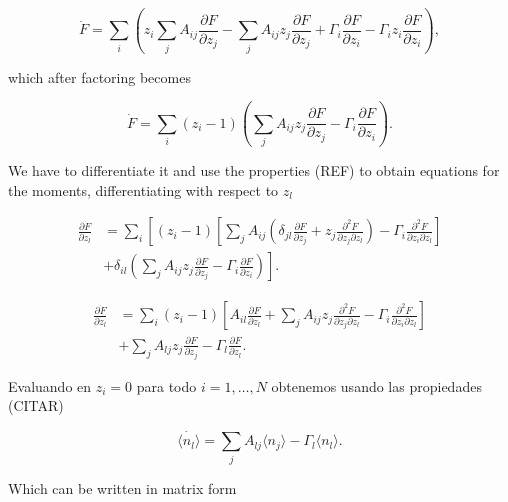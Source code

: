 \begin{equation}
\dot{F} = \sum_i\left( z_i\sum_jA_{ij}\frac{\partial F}{\partial z_j} - \sum_jA_{ij} z_j \frac{\partial F}{\partial z_j} + \Gamma_i\frac{\partial F}{\partial z_i} - \Gamma_iz_i\frac{\partial F}{\partial z_i}\right),
\end{equation}

which after factoring becomes

\begin{equation}
\label{eq:momg}
\dot{F} = \sum_i (z_i-1)\left(\sum_jA_{ij} z_j \frac{\partial F}{\partial z_j} - \Gamma_i\frac{\partial F}{\partial z_i}\right).
\end{equation}

We have to differentiate it and use the properties (REF) to obtain equations for the moments, differentiating with respect to $z_l$

\begin{equation}
\begin{split}
\frac{\partial \dot{F}}{\partial z_l} &= \sum_i\left[(z_i-1)\left[\sum_jA_{ij}\left(\delta_{jl}\frac{\partial F}{\partial z_j}+z_j\frac{\partial^2 F}{\partial z_j\partial z_l}\right)-\Gamma_i\frac{\partial^2 F}{\partial z_i\partial z_l}\right]\right.\\
&+\left.\delta_{il}\left(\sum_jA_{ij}z_j\frac{\partial F}{\partial z_j}-\Gamma_i\frac{\partial F}{\partial z_i}\right)\right].
\end{split}
\end{equation}

\begin{equation}
\begin{split}
\frac{\partial \dot{F}}{\partial z_l} &= \sum_i(z_i-1)\left[A_{il}\frac{\partial F}{\partial z_l}+\sum_jA_{ij}z_j\frac{\partial^2 F}{\partial z_j\partial z_l}-\Gamma_i\frac{\partial^2 F}{\partial z_i\partial z_l}\right]\\
&+\sum_jA_{lj}z_j\frac{\partial F}{\partial z_j}-\Gamma_l\frac{\partial F}{\partial z_l}.
\end{split}
\end{equation}

Evaluando en $z_i=0$ para todo $i=1,\dotsc,N$ obtenemos usando las propiedades (CITAR)

\begin{equation}
\dot{\langle n_l \rangle} = \sum_jA_{lj}\langle n_j\rangle-\Gamma_l\langle n_l\rangle.
\end{equation}

Which can be written in matrix form

